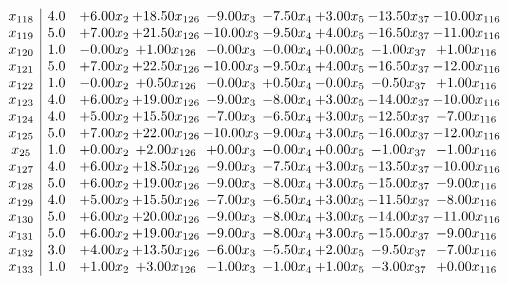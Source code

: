 \documentclass[8pt]{article}
\begin{document}
\[\begin{array}{c| c c@{\hskip 2pt} c@{\hskip 2pt} c@{\hskip 2pt} c@{\hskip 2pt} c@{\hskip 2pt} c@{\hskip 2pt} c@{\hskip 2pt} }
 x_{118}   &  4.0 & +  6.00 x_{2} & + 18.50 x_{126} & -9.00 x_{3} & -7.50 x_{4} & +  3.00 x_{5} & -13.50 x_{37} & -10.00 x_{116}\\
 x_{119}   &  5.0 & +  7.00 x_{2} & + 21.50 x_{126} & -10.00 x_{3} & -9.50 x_{4} & +  4.00 x_{5} & -16.50 x_{37} & -11.00 x_{116}\\
 x_{120}   &  1.0 & -0.00 x_{2} & +  1.00 x_{126} & -0.00 x_{3} & -0.00 x_{4} & +  0.00 x_{5} & -1.00 x_{37} & +  1.00 x_{116}\\
 x_{121}   &  5.0 & +  7.00 x_{2} & + 22.50 x_{126} & -10.00 x_{3} & -9.50 x_{4} & +  4.00 x_{5} & -16.50 x_{37} & -12.00 x_{116}\\
 x_{122}   &  1.0 & -0.00 x_{2} & +  0.50 x_{126} & -0.00 x_{3} & +  0.50 x_{4} & -0.00 x_{5} & -0.50 x_{37} & +  1.00 x_{116}\\
 x_{123}   &  4.0 & +  6.00 x_{2} & + 19.00 x_{126} & -9.00 x_{3} & -8.00 x_{4} & +  3.00 x_{5} & -14.00 x_{37} & -10.00 x_{116}\\
 x_{124}   &  4.0 & +  5.00 x_{2} & + 15.50 x_{126} & -7.00 x_{3} & -6.50 x_{4} & +  3.00 x_{5} & -12.50 x_{37} & -7.00 x_{116}\\
 x_{125}   &  5.0 & +  7.00 x_{2} & + 22.00 x_{126} & -10.00 x_{3} & -9.00 x_{4} & +  3.00 x_{5} & -16.00 x_{37} & -12.00 x_{116}\\
 x_{25}   &  1.0 & +  0.00 x_{2} & +  2.00 x_{126} & +  0.00 x_{3} & -0.00 x_{4} & +  0.00 x_{5} & -1.00 x_{37} & -1.00 x_{116}\\
 x_{127}   &  4.0 & +  6.00 x_{2} & + 18.50 x_{126} & -9.00 x_{3} & -7.50 x_{4} & +  3.00 x_{5} & -13.50 x_{37} & -10.00 x_{116}\\
 x_{128}   &  5.0 & +  6.00 x_{2} & + 19.00 x_{126} & -9.00 x_{3} & -8.00 x_{4} & +  3.00 x_{5} & -15.00 x_{37} & -9.00 x_{116}\\
 x_{129}   &  4.0 & +  5.00 x_{2} & + 15.50 x_{126} & -7.00 x_{3} & -6.50 x_{4} & +  3.00 x_{5} & -11.50 x_{37} & -8.00 x_{116}\\
 x_{130}   &  5.0 & +  6.00 x_{2} & + 20.00 x_{126} & -9.00 x_{3} & -8.00 x_{4} & +  3.00 x_{5} & -14.00 x_{37} & -11.00 x_{116}\\
 x_{131}   &  5.0 & +  6.00 x_{2} & + 19.00 x_{126} & -9.00 x_{3} & -8.00 x_{4} & +  3.00 x_{5} & -15.00 x_{37} & -9.00 x_{116}\\
 x_{132}   &  3.0 & +  4.00 x_{2} & + 13.50 x_{126} & -6.00 x_{3} & -5.50 x_{4} & +  2.00 x_{5} & -9.50 x_{37} & -7.00 x_{116}\\
 x_{133}   &  1.0 & +  1.00 x_{2} & +  3.00 x_{126} & -1.00 x_{3} & -1.00 x_{4} & +  1.00 x_{5} & -3.00 x_{37} & +  0.00 x_{116}\\

\end{array}\]
\end{document}
